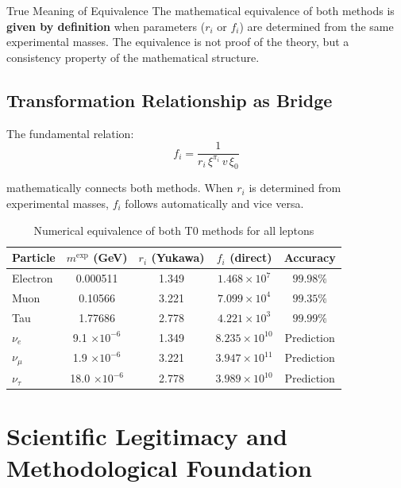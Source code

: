 	\begin{key}{True Meaning of Equivalence}{}
		The mathematical equivalence of both methods is \textbf{given by definition} when parameters ($r_i$ or $f_i$) are determined from the same experimental masses. The equivalence is not proof of the theory, but a consistency property of the mathematical structure.
	\end{key}
	
	\subsection{Transformation Relationship as Bridge}
	\label{subsec:transformation_relationship}
	
	The fundamental relation:
	\begin{equation}
		f_i = \frac{1}{r_i \, \xi^{\pi_i} \, v \, \xi_0}
		\label{eq:transformation_bridge}
	\end{equation}
	
	mathematically connects both methods. When $r_i$ is determined from experimental masses, $f_i$ follows automatically and vice versa.
	
	\begin{table}[H]
		\centering
		\begin{tabular}{lcccc}
			\toprule
			\textbf{Particle} & \textbf{$m^{\text{exp}}$ (GeV)} & \textbf{$r_i$ (Yukawa)} & \textbf{$f_i$ (direct)} & \textbf{Accuracy} \\
			\midrule
			Electron & 0.000511 & 1.349 & $1.468 \times 10^{7}$ & $99.98\%$ \\
			Muon & 0.10566 & 3.221 & $7.099 \times 10^{4}$ & $99.35\%$ \\
			Tau & 1.77686 & 2.778 & $4.221 \times 10^{3}$ & $99.99\%$ \\
			\midrule
			$\nu_e$ & 9.1 $\times 10^{-6}$ & 1.349 & $8.235 \times 10^{10}$ & Prediction \\
			$\nu_\mu$ & 1.9 $\times 10^{-6}$ & 3.221 & $3.947 \times 10^{11}$ & Prediction \\
			$\nu_\tau$ & 18.0 $\times 10^{-6}$ & 2.778 & $3.989 \times 10^{10}$ & Prediction \\
			\bottomrule
		\end{tabular}
		\caption{Numerical equivalence of both T0 methods for all leptons}
		\label{tab:numerical_equivalence_complete}
	\end{table}
	
	\section{Scientific Legitimacy and Methodological Foundation}
	\label{sec:scientific_legitimacy}
	
